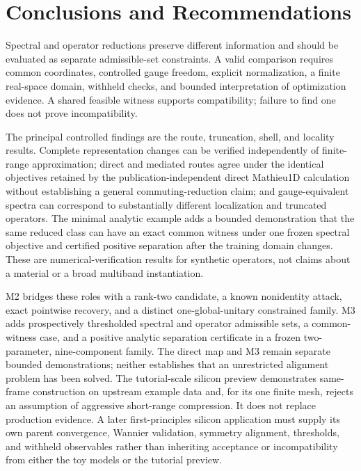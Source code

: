 \documentclass[preprint,12pt]{elsarticle}
\begin{document}
\section{Conclusions and Recommendations}
\label{sec:conclusions}

Spectral and operator reductions preserve different information and should be
evaluated as separate admissible-set constraints. A valid comparison requires
common coordinates, controlled gauge freedom, explicit normalization, a finite
real-space domain, withheld checks, and bounded interpretation of optimization
evidence. A shared feasible witness supports compatibility; failure to find
one does not prove incompatibility.

The principal controlled findings are the route, truncation, shell, and
locality results. Complete representation changes can be verified independently
of finite-range approximation; direct and mediated routes agree under the
identical objectives retained by the publication-independent direct Mathieu1D calculation
without establishing a general commuting-reduction claim; and gauge-equivalent spectra can correspond to
substantially different localization and truncated operators.
The minimal analytic example adds a bounded demonstration that the same reduced
class can have an exact common witness under one frozen spectral objective and
certified positive separation after the training domain changes. These are
numerical-verification results for synthetic operators, not claims about a
material or a broad multiband instantiation.

M2 bridges these roles with a rank-two candidate, a known nonidentity attack,
exact pointwise recovery, and a distinct one-global-unitary constrained family.
M3 adds prospectively thresholded spectral and operator admissible sets, a
common-witness case, and a positive analytic separation certificate in a frozen
two-parameter, nine-component family. The direct map and M3 remain separate
bounded demonstrations; neither establishes that an unrestricted alignment
problem has been solved. The tutorial-scale silicon preview demonstrates
same-frame construction on upstream example data and, for its one finite mesh,
rejects an assumption of aggressive short-range compression. It does not
replace production evidence. A later first-principles silicon application must
supply its own parent convergence, Wannier validation, symmetry alignment,
thresholds, and withheld observables rather than inheriting acceptance or
incompatibility from either the toy models or the tutorial preview.
\end{document}
